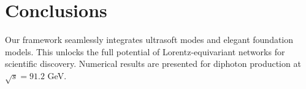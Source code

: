 \section{Conclusions}\label{sec:conclusions}

Our framework seamlessly integrates ultrasoft modes and elegant
foundation models. This unlocks the full potential of
Lorentz-equivariant networks for scientific discovery. Numerical results
are presented for diphoton production at $\sqrt{s} = 91.2$ GeV.

